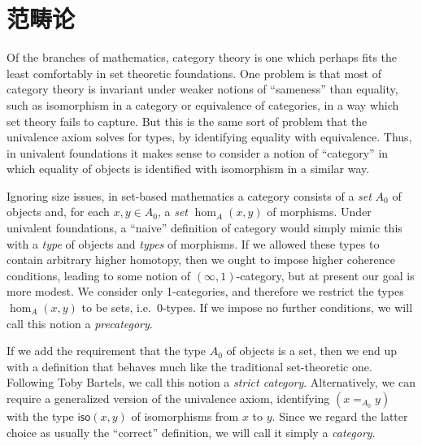 \chapter{范畴论}
\label{cha:category-theory}

Of the branches of mathematics, category theory is one which perhaps fits the least comfortably in set theoretic foundations.
One problem is that most of category theory is invariant under weaker notions of ``sameness'' than equality, such as isomorphism in a category or equivalence of categories, in a way which set theory fails to capture.
But this is the same sort of problem that the univalence axiom solves for types, by identifying equality with equivalence.
Thus, in univalent foundations it makes sense to consider a notion of ``category'' in which equality of objects is identified with isomorphism in a similar way.

Ignoring size issues, in set-based mathematics a category consists of a \emph{set} $A_0$ of objects and, for each $x,y\in A_0$, a \emph{set} $\hom_A(x,y)$ of morphisms.
Under univalent foundations, a ``naive'' definition of category would simply mimic this with a \emph{type} of objects and \emph{types} of morphisms.
If we allowed these types to contain arbitrary higher homotopy, then we ought to impose higher coherence conditions, leading to some notion of $(\infty,1)$-category,
%
but at present our goal is more modest.
We consider only 1-categories, and therefore we restrict the types $\hom_A(x,y)$ to be sets, i.e.\ 0-types.
If we impose no further conditions, we will call this notion a \emph{precategory}.

If we add the requirement that the type $A_0$ of objects is a set, then we end up with a definition that behaves much like the traditional set-theoretic one.
Following Toby Bartels, we call this notion a \emph{strict category}.
%
Alternatively, we can require a generalized version of the univalence axiom, identifying $(x=_{A_0} y)$ with the type $\mathsf{iso}(x,y)$ of isomorphisms from $x$ to $y$.
Since we regard the latter choice as usually the ``correct'' definition, we will call it simply a \emph{category}.

